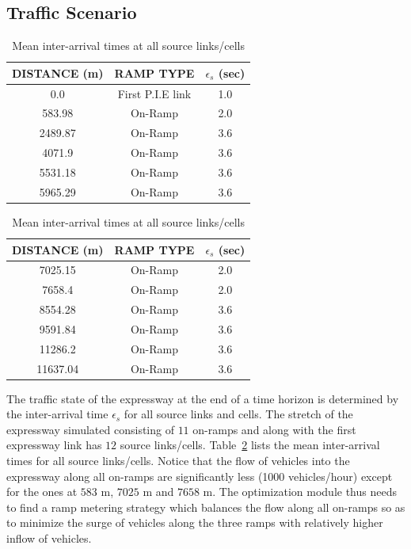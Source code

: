 \documentclass[12pt]{article}
\begin{document}
\subsection{Traffic Scenario}
\label{subsec:traffic-scenario}
 \begin{table}[!htbp]
 \caption{Mean inter-arrival times at all source links/cells}
 \begin{tabular}[b]{ccc}\hline
       {\bf DISTANCE} (m) & {\bf RAMP TYPE} & {\bf $\epsilon_s$} (sec)\\ \hline
      0.0 & First P.I.E link & 1.0\\
      583.98 & On-Ramp & 2.0\\ 
      2489.87 & On-Ramp & 3.6\\ 
      4071.9 & On-Ramp & 3.6\\ 
      5531.18 & On-Ramp & 3.6\\ 
      5965.29 & On-Ramp & 3.6\\ \hline
      \end{tabular}
      \quad
      \begin{tabular}[b]{ccc}\hline
        {\bf DISTANCE} (m) & {\bf RAMP TYPE}& {\bf $\epsilon_s$} (sec) \\ \hline
      7025.15 & On-Ramp & 2.0\\ 
      7658.4 & On-Ramp & 2.0\\ 
      8554.28 & On-Ramp & 3.6\\ 
      9591.84 & On-Ramp & 3.6\\ 
      11286.2 & On-Ramp & 3.6\\ 
      11637.04 & On-Ramp & 3.6\\ \hline
     \end{tabular}
       \label{table:iat}
 \end{table}
 
  The traffic state of the expressway at the end of a time horizon is determined by the inter-arrival time $\epsilon_s$ for all source links and cells. The stretch of the expressway simulated consisting of $11$ on-ramps and along with the first expressway link has $12$ source links/cells. Table~\ref{table:iat} lists the mean inter-arrival times for all source links/cells. Notice that the flow of vehicles into the expressway along all on-ramps  are significantly less (1000 vehicles/hour) except for the ones at $583$ m, $7025$ m and $7658$ m. The optimization module thus needs to find a ramp metering strategy which balances the flow along all on-ramps so as to minimize the surge of vehicles along the three ramps with relatively higher inflow of vehicles.
\end{document}
